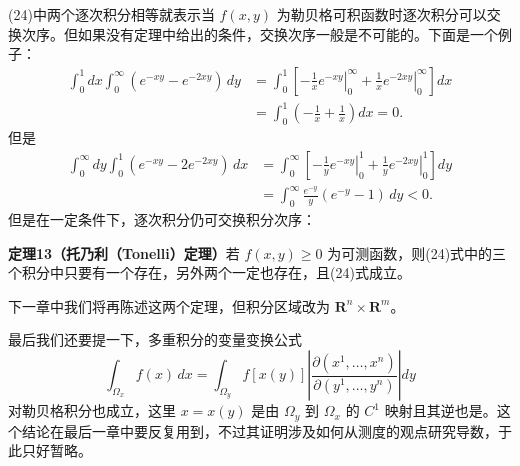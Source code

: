 (24)中两个逐次积分相等就表示当 $f(x,y)$ 为勒贝格可积函数时逐次积分可以交换次序。但如果没有定理中给出的条件，交换次序一般是不可能的。下面是一个例子：
\[
\begin{aligned}
 \int_0^1dx\int_0^\infty(e^{-xy}-e^{-2xy})\,dy
 &=\int_0^1\left[\left.-\frac1x e^{-xy}\right|_0^\infty
 +\left.\frac1x e^{-2xy}\right|_0^\infty\right]dx\\
 &=\int_0^1\left(-\frac1x+\frac1x\right)dx=0.
\end{aligned}
\]
但是
\[
\begin{aligned}
 \int_0^\infty dy\int_0^1(e^{-xy}-2e^{-2xy})\,dx
 &=\int_0^\infty\left[\left.-\frac1y e^{-xy}\right|_0^1
 +\left.\frac1y e^{-2xy}\right|_0^1\right]dy\\
 &=\int_0^\infty\frac{e^{-y}}{y}(e^{-y}-1)\,dy<0.
\end{aligned}
\]
但是在一定条件下，逐次积分仍可交换积分次序：

\noindent\textbf{定理13（托乃利（Tonelli）定理）}\quad 若 $f(x,y)\ge0$ 为可测函数，则(24)式中的三个积分中只要有一个存在，另外两个一定也存在，且(24)式成立。

下一章中我们将再陈述这两个定理，但积分区域改为 $\mathbf R^n\times\mathbf R^m$。

最后我们还要提一下，多重积分的变量变换公式
\[
 \int_{\Omega_x}f(x)\,dx
 =\int_{\Omega_y}f[x(y)]\left|\frac{\partial(x^1,\ldots,x^n)}{\partial(y^1,\ldots,y^n)}\right|dy
\]
对勒贝格积分也成立，这里 $x=x(y)$ 是由 $\Omega_y$ 到 $\Omega_x$ 的 $C^1$ 映射且其逆也是。这个结论在最后一章中要反复用到，不过其证明涉及如何从测度的观点研究导数，于此只好暂略。
